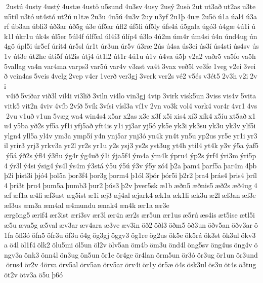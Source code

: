  2ustú 4usty 4ustý 4ustæ 4ustö u5sund 4u3sv 4usy 2usý 2usö 2ut ut3að ut2as u3te u5til u3tó ut4stó ut2ú u1tæ 2u3u 4u5ú 4u3v 2uy u3yf 2u1þ 4uæ 2u5ö ú1a úal4 ú3arf úb3an úbli3 úð3ar úð5g ú3e úf5ar úfl2 úf5li úf5ly úfs4á ú5gala úgó3 ú4gæ 4ú1i úk1l úkr1u úk4s úl5er 5úl4f úlf5al úl4í3 úlíp4 ú3lo 4ú2m úm4r úm4si ú4n únd4ug ún4gö úpl5i úr5ef úrít4 úr5sl úr1t úr3un úr5v ú3ræ 2ús ú4sa ús3ei ús3í ús4sti ús4sv ús1v út3e út2he úti5f út2is útj4 út1l2 út1r 4ú1u ú1v ú4va ú5þ v2a2 vaðr5 va5fo va5h 5vallag va4n var4ma varps3 var5ú var4v v3ast va4t 3vax veð5l ve3fe 1veg v2ei 3veið vein4as 5veis 4velg 2vep v4er 1verð ver3gj 3verk ver2s vé2 v5és v3ét5 2v3h v2i 2vi  v4ið 5viðar við3l vil4i vi3lið 3viln vi4lo vin3gj 4vip 3virk visk5un 3viss vis4v 5vita vitk5 vit2n 4viv 4víb 2víð 5vík 3vísi vísl3a ví1v 2vn vo3k vol4 vork4 vor4r 4vr1 4vs 2vu v1uð v1un 5væg wa4 win4s4 x5ar x2as x3e x3f x5i xis4 xí3 xík4 x5íu xt5að x1u4 y5ba yð2s yf5a yf1i yfj5að yft4is y1i yj3ar yj5ó yk5e yk3i yk3su yk3u yk3v ylf5i ylgn4 yll5a yl4v ym3a ymp5í y4n ynj5ar ynj3ó yn4k yn4t yn5u yp2us yr5e yr1i yr3il yrir3 yrj3 yrkv3a yr2l yr2s yr1u y2s ysj3 ys2s yst3ug yt4h ytil4 yt4k y3v ý5a ýaf5 ý5á ýð2s ýfl4 ý3flu ýg4r ýg4uð ý1i ýja5f4 ým4a ým4k ýpru4 ýp2s ýrf4 ýri3m ýri5p4 ýr3l ý4si ýsig4 ýs4l ýs4m ý3stá ý5u ý5ú ý3v ý5y zó4 þ2a þam4 þarf5a þar4m 4þb þ2i þist3i þjó4 þol5a þor3f4 þor3g þorm4 þ1ól 3þór þór5i þ2r2 þra4 þrás4 þris4 þríl4 þrí3t þru4 þum5a þumb3 þur2 þús3 þ2v þver5sk æ1b æðn5 æðnis5 æð2s æð4ug 4æf æf1a æ4fi æf3ust æg5ist æ1i æj3 æj4al æjark4 æk1a æk1li æk3u æ2l æl3an æl3e æl3us æm3a æm4al æ4mundu ænak4 æn4k ær1a ær3e 	ærgöng5 ærif4 ær3ist æri3sv ær3l ær4n ær2s ær5un ær1us æ5rú æs4is æt5ise ætl5i æ5u æva5g æ5val æv3ar æv4ara æ3ve æv3in öð2 öðl3 öðm5 öð3un öðv5an öðv3ar ö1fa öfl3ó öfn5 öfr3u öf3u ö4g ög3gj öggv3 ög1re ög2us ök5e ök5rá ök3st ök3ul ökv3a ö4l öl1f4 ölk2 ölu5mi öl5un öl2v ölv5an öm4b öm3u önd4l öng5sv öng4us öng4v öngv3a önk3 önn4l ön3ug ön5un ör1e ör4ge ör4lan örm5un ör3ó ör3ug ör1un ör3und örus4 ör2v 4örva örv5al örv5an örv5ar örv4i ör1y ör5æ ö4s ösk3ul ös3u öt4s ö3tug öt2v ötv3a ö5u þ6ó